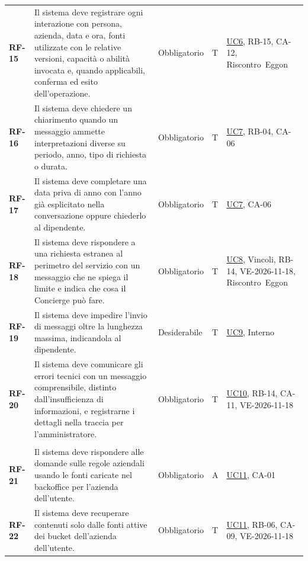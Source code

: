 \documentclass[documento]{gpt}
\begin{document}
{\begin{longtable}{@{}>{\raggedright\arraybackslash}p{1.35cm}>{\raggedright\arraybackslash}p{7.3cm}>{\raggedright\arraybackslash}p{1.9cm}>{\centering\arraybackslash}p{0.75cm}>{\raggedright\arraybackslash}p{3.1cm}@{}}
\leavevmode\hypertarget{req:RF-15}{\textbf{RF-15}} & Il sistema deve registrare ogni interazione con persona, azienda, data e ora, fonti utilizzate con le relative versioni, capacità o abilità invocata e, quando applicabili, conferma ed esito dell’operazione. & Obbligatorio & T & \hyperref[uc:msg]{UC6}, \mbox{RB-15}, \mbox{CA-12}, \mbox{Riscontro Eggon} \\
\leavevmode\hypertarget{req:RF-16}{\textbf{RF-16}} & Il sistema deve chiedere un chiarimento quando un messaggio ammette interpretazioni diverse su periodo, anno, tipo di richiesta o durata. & Obbligatorio & T & \hyperref[uc:chiarimento]{UC7}, \mbox{RB-04}, \mbox{CA-06} \\
\leavevmode\hypertarget{req:RF-17}{\textbf{RF-17}} & Il sistema deve completare una data priva di anno con l’anno già esplicitato nella conversazione oppure chiederlo al dipendente. & Obbligatorio & T & \hyperref[uc:chiarimento]{UC7}, \mbox{CA-06} \\
\leavevmode\hypertarget{req:RF-18}{\textbf{RF-18}} & Il sistema deve rispondere a una richiesta estranea al perimetro del servizio con un messaggio che ne spiega il limite e indica che cosa il Concierge può fare. & Obbligatorio & T & \hyperref[uc:fuori_ambito]{UC8}, \mbox{Vincoli}, \mbox{RB-14}, \mbox{VE-2026-11-18}, \mbox{Riscontro Eggon} \\
\leavevmode\hypertarget{req:RF-19}{\textbf{RF-19}} & Il sistema deve impedire l’invio di messaggi oltre la lunghezza massima, indicandola al dipendente. & Desiderabile & T & \hyperref[uc:msg_lungo]{UC9}, \mbox{Interno} \\
\leavevmode\hypertarget{req:RF-20}{\textbf{RF-20}} & Il sistema deve comunicare gli errori tecnici con un messaggio comprensibile, distinto dall’insufficienza di informazioni, e registrarne i dettagli nella traccia per l’amministratore. & Obbligatorio & T & \hyperref[uc:errore_tecnico]{UC10}, \mbox{RB-14}, \mbox{CA-11}, \mbox{VE-2026-11-18} \\
\addlinespace[3pt]\multicolumn{5}{@{}l}{\textbf{\sffamily Conoscenza aziendale}} \\ \addlinespace[2pt]
\leavevmode\hypertarget{req:RF-21}{\textbf{RF-21}} & Il sistema deve rispondere alle domande sulle regole aziendali usando le fonti caricate nel backoffice per l’azienda dell’utente. & Obbligatorio & A & \hyperref[uc:regole]{UC11}, \mbox{CA-01} \\
\leavevmode\hypertarget{req:RF-22}{\textbf{RF-22}} & Il sistema deve recuperare contenuti solo dalle fonti attive dei bucket dell’azienda dell’utente. & Obbligatorio & T & \hyperref[uc:regole]{UC11}, \mbox{RB-06}, \mbox{CA-09}, \mbox{VE-2026-11-18} \\

\end{longtable}}
\end{document}
